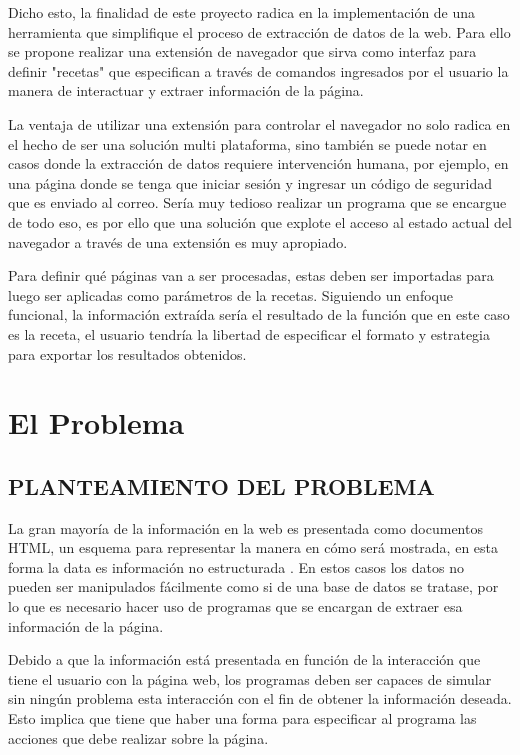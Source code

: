 \documentclass[12pt]{report}
\begin{document}
Dicho esto, la finalidad de este proyecto radica en la implementación de una herramienta que simplifique el proceso de extracción de datos de la web. Para ello se propone realizar una extensión de navegador que sirva como interfaz para definir "recetas" que especifican a través de comandos ingresados por el usuario la manera de interactuar y extraer información de la página.

La ventaja de utilizar una extensión para controlar el navegador no solo radica en el hecho de ser una solución multi plataforma, sino también se puede notar en casos donde la extracción de datos requiere intervención humana, por ejemplo, en una página donde se tenga que iniciar sesión y ingresar un código de seguridad que es enviado al correo. Sería muy tedioso realizar un programa que se encargue de todo eso, es por ello que una solución que explote el acceso al estado actual del navegador a través de una extensión es muy apropiado.

Para definir qué páginas van a ser procesadas, estas deben ser importadas para luego ser aplicadas como parámetros de la recetas. Siguiendo un enfoque funcional, la información extraída sería el resultado de la función que en este caso es la receta, el usuario tendría la libertad de especificar el formato y estrategia para exportar los resultados obtenidos.

\break


\chapter{El Problema}

\section[Planteamiento del Problema]{PLANTEAMIENTO DEL PROBLEMA}

La gran mayoría de la información en la web es presentada como documentos HTML, un esquema para representar la manera en cómo será mostrada, en esta forma la data es información no estructurada \cite{chaulagain2017cloud}. En estos casos los datos no pueden ser manipulados fácilmente como si de una base de datos se tratase, por lo que es necesario hacer uso de programas que se encargan de extraer esa información de la página.

Debido a que la información está presentada en función de la interacción que tiene el usuario con la página web, los programas deben ser capaces de simular sin ningún problema esta interacción con el fin de obtener la información deseada. Esto implica que tiene que haber una forma para especificar al programa las acciones que debe realizar sobre la página.
\end{document}

